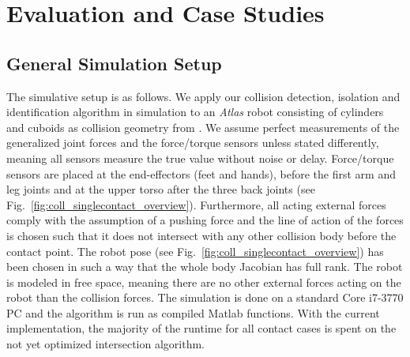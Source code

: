
\section{Evaluation and Case Studies}
\label{sec:simu}

\subsection{General Simulation Setup}
\label{sec:setup}
The simulative setup is as follows.
We apply our collision detection, isolation and identification algorithm in simulation to an \emph{Atlas} robot consisting of cylinders and cuboids as collision geometry from \cite{DRCSim}.
We assume perfect measurements of the generalized joint forces and the force/torque sensors unless stated differently, meaning all sensors measure the true value without noise or delay.
Force/torque sensors are placed at the end-effectors (feet and hands), before the first arm and leg joints and at the upper torso after the three back joints (see Fig.~\ref{fig:coll_singlecontact_overview}).
Furthermore, all acting external forces comply with the assumption of a pushing force and the line of action of the forces is chosen such that it does not intersect with any other collision body before the contact point.
The robot pose (see Fig.~\ref{fig:coll_singlecontact_overview}) has been chosen in such a way that the whole body Jacobian has full rank.
The robot is modeled in free space, meaning there are no other external forces acting on the robot than the collision forces.
The simulation is done on a standard Core i7-3770 PC and the algorithm is run as compiled Matlab functions.
With the current implementation, the majority of the runtime for all contact cases is spent on the not yet optimized intersection algorithm.


